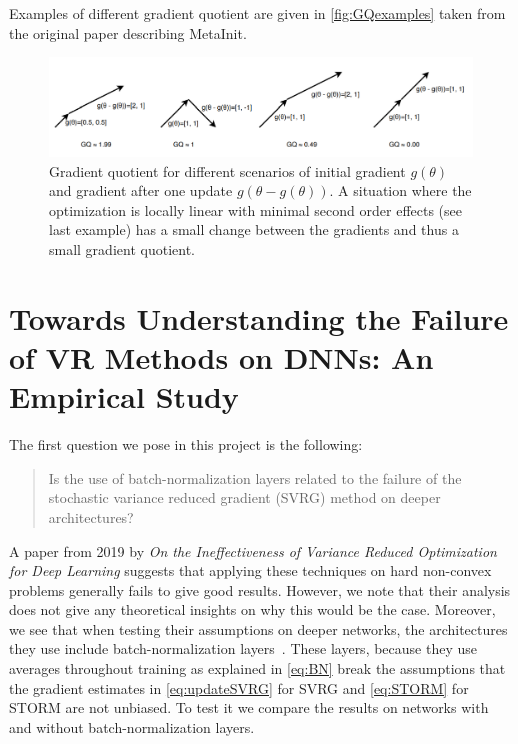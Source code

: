 \documentclass[a4paper,11pt,oneside]{report}
\begin{document}
Examples of different gradient quotient are given in \autoref{fig:GQexamples} taken from the original paper describing MetaInit.

\begin{figure}
    \centering
    \includegraphics{figures/MetaInit.png}
    \caption{Gradient quotient for different scenarios of initial gradient $g(\theta)$ and gradient after one update $g(\theta - g(\theta))$. A situation where the optimization is locally linear with minimal second order effects (see last example) has a small change between the gradients and thus a small gradient quotient.}
    \label{fig:GQexamples}
\end{figure}

\chapter{Towards Understanding the Failure of VR Methods on DNNs: An Empirical Study}

The first question we pose in this project is the following: 
 \begin{quotation}
  Is the use of batch-normalization layers related to the failure of the stochastic variance reduced gradient (SVRG) method on deeper architectures? 
 \end{quotation}
A paper from 2019 by \citeauthor{Defazio2019} \textit{On the Ineffectiveness of Variance Reduced Optimization for Deep Learning} suggests that applying these techniques on hard non-convex problems generally fails to give good results. However, we note that their analysis does not give any theoretical insights on why this would be the case. Moreover, we see that when testing their assumptions on deeper networks, the architectures they use include batch-normalization layers~\citep{ioffe2015batch}. These layers, because they use averages throughout training as explained in \autoref{eq:BN} break the assumptions that the gradient estimates in \autoref{eq:updateSVRG} for SVRG and \autoref{eq:STORM} for STORM are not unbiased. To test it we compare the results on networks with and without batch-normalization layers.
\end{document}
